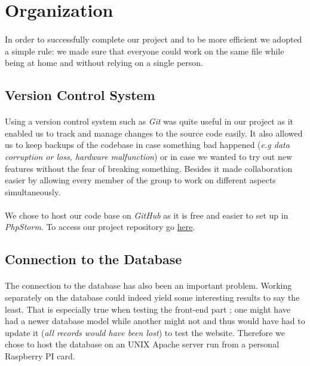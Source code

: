 \documentclass[11pt,a4paper,titlepage]{article}
\begin{document}
\section{Organization}
\paragraph{} 
In order to successfully complete our project and to be more efficient we adopted a simple rule: we made sure that everyone could work on the same file while being at home and without relying on a single person.

\subsection{Version Control System}
\paragraph{}
Using a version control system such as \textit{Git} was quite useful in our project as it enabled us to track and manage changes to the source code easily. It also allowed us to keep backups of the codebase in case something bad happened (\textit{e.g data corruption or loss, hardware malfunction}) or in case we wanted to try out new features without the fear of breaking something. Besides it made collaboration easier by allowing every member of the group to work on different aspects simultaneously.
\paragraph{}
We chose to host our code base on \textit{GitHub} as it is free and easier to set up in \textit{PhpStorm}. To access our project repository go \href{https://github.com/TheRefraction/Martine-travels}{here}.

\subsection{Connection to the Database}
\paragraph{}
The connection to the database has also been an important problem. Working separately on the database could indeed yield some interesting results to say the least. That is especially true when testing the front-end part ; one might have had a newer database model while another might not and thus would have had to update it (\textit{all records would have been lost}) to test the website. Therefore we chose to host the database on an UNIX Apache server run from a personal Raspberry PI card.
\end{document}
